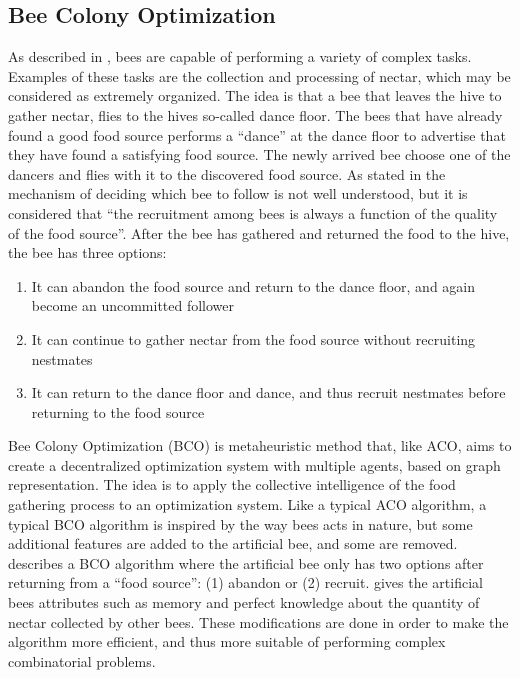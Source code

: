 
\subsection{Bee Colony Optimization}
As described in \citet{lucic03}, bees are capable of performing a variety of complex tasks. Examples of these tasks are the collection and processing of nectar, which may be considered as extremely organized. The idea is that a bee that leaves the hive to gather nectar, flies to the hives so-called dance floor. The bees that have already found a good food source performs a ``dance'' at the dance floor to advertise that they have found a satisfying food source. The newly arrived bee choose one of the dancers and flies with it to the discovered food source. As stated in \citet{lucic03} the mechanism of deciding which bee to follow is not well understood, but it is considered that ``the recruitment among bees is always a function of the quality of the food source''. After the bee has gathered and returned the food to the hive, the bee has three options\citep{lucic03}:

\begin{enumerate}
  \item It can abandon the food source and return to the dance floor, and again become an uncommitted follower
  \item It can continue to gather nectar from the food source without recruiting nestmates
  \item It can return to the dance floor and dance, and thus recruit nestmates before returning to the food source
\end{enumerate}

Bee Colony Optimization (BCO) is metaheuristic method that, like ACO, aims to create a decentralized optimization system with multiple agents, based on graph representation. The idea is to apply the collective intelligence of the food gathering process to an optimization system. Like a typical ACO algorithm, a typical BCO algorithm is inspired by the way bees acts in nature, but some additional features are added to the artificial bee, and some are removed. \citet{nikolic14} describes a BCO algorithm where the artificial bee only has two options after returning from a ``food source'': (1) abandon or (2) recruit. \citet{lucic03} gives the artificial bees attributes such as memory and perfect knowledge about the quantity of nectar collected by other bees. These modifications are done in order to make the algorithm more efficient, and thus more suitable of performing complex combinatorial problems.


